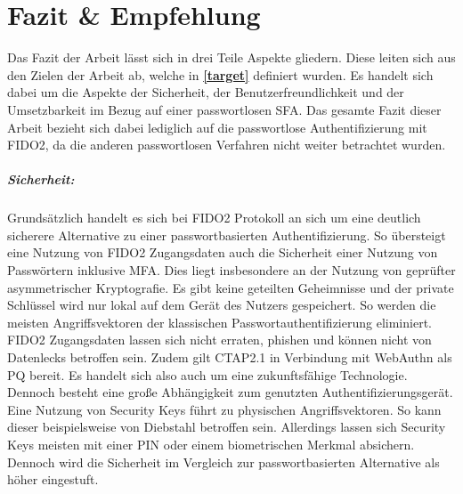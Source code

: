 
\chapter{Fazit \& Empfehlung}
Das Fazit der Arbeit lässt sich in drei Teile Aspekte gliedern. Diese leiten sich aus den Zielen der Arbeit ab, welche in \textbf{\ref{target}} definiert wurden. Es handelt sich dabei um die Aspekte der Sicherheit, der Benutzerfreundlichkeit und der Umsetzbarkeit im Bezug auf einer passwortlosen \ac{SFA}. Das gesamte Fazit dieser Arbeit bezieht sich dabei lediglich auf die passwortlose Authentifizierung mit FIDO2, da die anderen passwortlosen Verfahren nicht weiter betrachtet wurden.

\paragraph*{Sicherheit:} Grundsätzlich handelt es sich bei FIDO2 Protokoll an sich um eine deutlich sicherere Alternative zu einer passwortbasierten Authentifizierung. So übersteigt eine Nutzung von FIDO2 Zugangsdaten auch die Sicherheit einer Nutzung von Passwörtern inklusive \ac{MFA}. Dies liegt insbesondere an der Nutzung von geprüfter asymmetrischer Kryptografie. Es gibt keine geteilten Geheimnisse und der private Schlüssel wird nur lokal auf dem Gerät des Nutzers gespeichert. So werden die meisten Angriffsvektoren der klassischen Passwortauthentifizierung eliminiert. FIDO2 Zugangsdaten lassen sich nicht erraten, phishen und können nicht von Datenlecks betroffen sein. Zudem gilt CTAP2.1 in Verbindung mit WebAuthn als \ac{PQ} bereit. Es handelt sich also auch um eine zukunftsfähige Technologie. Dennoch besteht eine große Abhängigkeit zum genutzten Authentifizierungsgerät. Eine Nutzung von Security Keys führt zu physischen Angriffsvektoren. So kann dieser beispielsweise von Diebstahl betroffen sein. Allerdings lassen sich Security Keys meisten mit einer PIN oder einem biometrischen Merkmal absichern. Dennoch wird die Sicherheit im Vergleich zur passwortbasierten Alternative als höher eingestuft.

